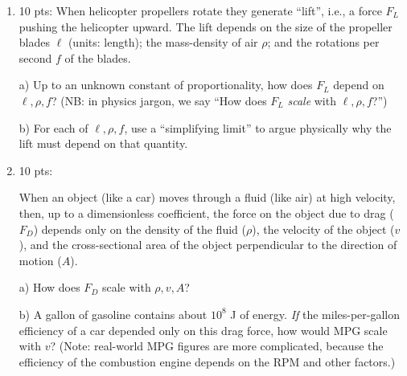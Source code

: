 \documentclass[10pt, oneside]{amsart}   	%
\begin{document}
\begin{enumerate}
(b) Wind of speed $W_0$ blowing from P to Q.

(c) Wind of speed $W_0$ blowing perpendicular to a
line connecting P and Q.

(d) Wind of speed $W_0$ blowing at an angle $\theta$ from a
line connecting P and Q.

(e) Show that the round trip flying time is always
least for part (a).

(f) What happens to the answers to (b)-(d) when
$W_0 > U_0$? Interpret this limiting condition physically.

(g) Using the Taylor expansion, obtain an expression for part (d) valid to second order in $W_0$ (e.g., keep terms up to and including $W_0^2$). The expansions $\sqrt{1+x} = 1 + \frac{x}{2} + \cdots$ and $\frac{1}{1-x} = 1 + x + \cdots$ may prove useful, or refer to KK Note 1.3.

\vspace{5mm}

\item{10 pts:} When helicopter propellers rotate they  generate ``lift'',  i.e., a force $F_{L}$ pushing the helicopter upward. The lift depends on the size of the propeller blades $\ell$ (units: length); the mass-density of air $\rho$; and the rotations per second $f$ of the blades.

a) Up to an unknown constant of proportionality, how does $F_L$ depend on $\ell, \rho, f$? (NB: in physics jargon, we say  ``How does $F_L$ \emph{scale} with $\ell, \rho, f$?'')

b) For each of $\ell, \rho, f$, use a ``simplifying limit'' to argue physically why the lift must depend on that quantity.

\item{10 pts}:

When an object (like a car) moves through a fluid (like air) at high velocity,  then, up to a dimensionless coefficient, the  force on the object due to drag ($F_D$) depends only on the density of the fluid ($\rho$), the velocity of the object ($v$), and the cross-sectional area of the object perpendicular to the direction of motion ($A$). 

a) How does $F_D$ scale with $\rho, v, A$?

b)  A gallon of gasoline contains about $10^8$ J of energy. \emph{If} the miles-per-gallon efficiency of a car depended only on this drag force, how would MPG scale with $v$?  (Note: real-world MPG figures are more complicated, because the efficiency of the combustion engine  depends on the RPM and other factors.)


\end{enumerate}
\end{document}
